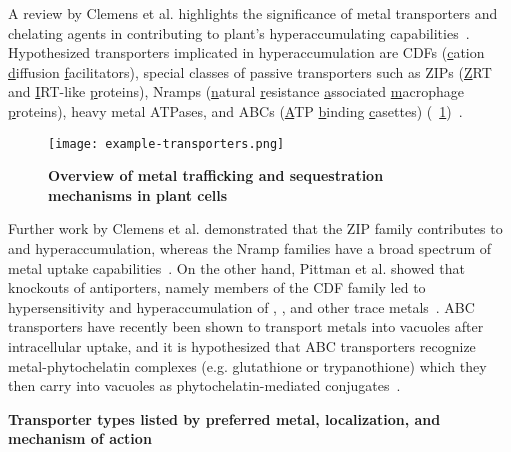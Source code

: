 \documentclass[../main/main]{subfiles}
\begin{document}
A review by Clemens et al. highlights the significance of metal transporters and chelating agents in contributing to plant's hyperaccumulating capabilities~\cite{clemens2002long}. Hypothesized transporters implicated in hyperaccumulation are
CDFs (\underline{c}ation \underline{d}iffusion \underline{f}acilitators), special classes of passive transporters such as
ZIPs (\underline{Z}RT and \underline{I}RT-like \underline{p}roteins),
Nramps (\underline{n}atural \underline{r}esistance \underline{a}ssociated \underline{m}acrophage \underline{p}roteins),
heavy metal ATPases, and
ABCs (\underline{A}TP \underline{b}inding \underline{c}asettes)
(\FIGURE~\ref{figure:chapter1:example-transporter})~\cite{clemens2002long,kramer2010metal}.

\begin{figure}[H]
	\centering
	\texttt{[image: example-transporters.png]}
	\caption[Overview of metal trafficking and sequestration mechanisms in plant cells]
	{
		\textbf{Overview of metal trafficking and sequestration mechanisms in plant cells}
	}
	\label{figure:chapter1:example-transporter}
\end{figure}

Further work by Clemens et al. demonstrated that the ZIP family contributes to  and  hyperaccumulation, whereas the Nramp families have a broad spectrum of metal uptake capabilities~\cite{clemens2001molecular}. On the other hand, Pittman et al. showed that knockouts of antiporters, namely members of the CDF family led to hypersensitivity and hyperaccumulation of , , and other trace metals~\cite{clemens2002transporter,pittman2005managing}.
ABC transporters have recently been shown to transport metals into vacuoles after intracellular uptake, and it is hypothesized that ABC transporters recognize metal-phytochelatin complexes (e.g. glutathione or trypanothione) which they then carry into vacuoles as phytochelatin-mediated conjugates~\cite{hall2003transition,legare2001leishmania}.

\begin{table}[H]
\small
\centering
	
	\caption[Transporter types listed by preferred metal, localization, and mechanism of action]
	{
		\textbf{Transporter types listed by preferred metal, localization, and mechanism of action}
	}
	\label{table:chapter1:transporters}
\end{table}
\end{document}
